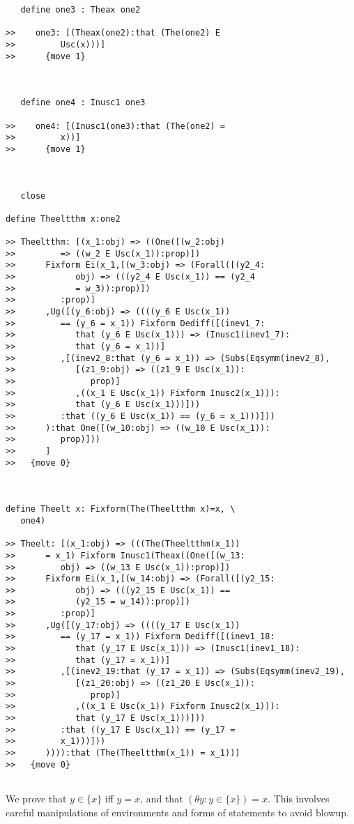 \documentclass[12pt]{article}
\begin{document}
\begin{verbatim}
   define one3 : Theax one2

>>    one3: [(Theax(one2):that (The(one2) E
>>         Usc(x)))]
>>      {move 1}



   define one4 : Inusc1 one3

>>    one4: [(Inusc1(one3):that (The(one2) =
>>         x))]
>>      {move 1}



   close

define Theeltthm x:one2

>> Theeltthm: [(x_1:obj) => ((One([(w_2:obj)
>>         => ((w_2 E Usc(x_1)):prop)])
>>      Fixform Ei(x_1,[(w_3:obj) => (Forall([(y2_4:
>>            obj) => (((y2_4 E Usc(x_1)) == (y2_4
>>            = w_3)):prop)])
>>         :prop)]
>>      ,Ug([(y_6:obj) => ((((y_6 E Usc(x_1))
>>         == (y_6 = x_1)) Fixform Dediff([(inev1_7:
>>            that (y_6 E Usc(x_1))) => (Inusc1(inev1_7):
>>            that (y_6 = x_1))]
>>         ,[(inev2_8:that (y_6 = x_1)) => (Subs(Eqsymm(inev2_8),
>>            [(z1_9:obj) => ((z1_9 E Usc(x_1)):
>>               prop)]
>>            ,((x_1 E Usc(x_1)) Fixform Inusc2(x_1))):
>>            that (y_6 E Usc(x_1)))]))
>>         :that ((y_6 E Usc(x_1)) == (y_6 = x_1)))]))
>>      ):that One([(w_10:obj) => ((w_10 E Usc(x_1)):
>>         prop)]))
>>      ]
>>   {move 0}



define Theelt x: Fixform(The(Theeltthm x)=x, \
   one4)

>> Theelt: [(x_1:obj) => (((The(Theeltthm(x_1))
>>      = x_1) Fixform Inusc1(Theax((One([(w_13:
>>         obj) => ((w_13 E Usc(x_1)):prop)])
>>      Fixform Ei(x_1,[(w_14:obj) => (Forall([(y2_15:
>>            obj) => (((y2_15 E Usc(x_1)) ==
>>            (y2_15 = w_14)):prop)])
>>         :prop)]
>>      ,Ug([(y_17:obj) => ((((y_17 E Usc(x_1))
>>         == (y_17 = x_1)) Fixform Dediff([(inev1_18:
>>            that (y_17 E Usc(x_1))) => (Inusc1(inev1_18):
>>            that (y_17 = x_1))]
>>         ,[(inev2_19:that (y_17 = x_1)) => (Subs(Eqsymm(inev2_19),
>>            [(z1_20:obj) => ((z1_20 E Usc(x_1)):
>>               prop)]
>>            ,((x_1 E Usc(x_1)) Fixform Inusc2(x_1))):
>>            that (y_17 E Usc(x_1)))]))
>>         :that ((y_17 E Usc(x_1)) == (y_17 =
>>         x_1)))]))
>>      )))):that (The(Theeltthm(x_1)) = x_1))]
>>   {move 0}


\end{verbatim}

We prove that $y \in \{x\}$ iff $y=x$, and that $(\theta y: y \in \{x\})=x$.  This involves careful manipulations of environments and forms of statements to avoid blowup.
\end{document}
